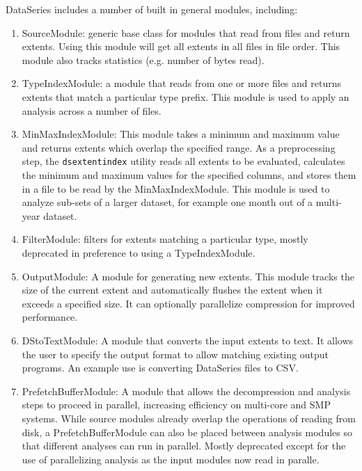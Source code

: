 DataSeries includes a number of built in general modules, including:
\begin{enumerate} 

\item SourceModule: generic base class for modules that read from 
 files and return extents.  Using this module will get all extents 
 in all files in file order.  This module also tracks statistics (e.g. number of bytes read).

  \item TypeIndexModule: a module that reads from one or more files and
returns extents that match a particular type prefix.  This module is used
to apply an analysis across a number of files.

  \item MinMaxIndexModule: This module takes a minimum and maximum
value and returns extents which overlap the specified range.  As a
preprocessing step, the {\tt dsextentindex} utility reads all extents
to be evaluated, calculates the minimum and maximum values for the
specified columns, and stores them in a file to be read by the
MinMaxIndexModule.  This module is used to analyze sub-sets of a larger
dataset, for example one month out of a multi-year dataset.

  \item FilterModule: filters for extents matching a
particular type, mostly deprecated in preference to using a
TypeIndexModule.

  \item OutputModule: A module for generating new extents.  This
module tracks the size of the current extent and automatically flushes
the extent when it exceeds a specified size.  It can optionally parallelize
compression for improved performance.

  \item DStoTextModule: A module that converts the input extents to
text.  It allows the user to specify the output format to allow
matching existing output programs.  An example use is
converting DataSeries files to CSV.

  \item PrefetchBufferModule: A module that allows the decompression
and analysis steps to proceed in parallel, increasing efficiency on
multi-core and SMP systems.  While source modules already overlap the
operations of reading from disk, a PrefetchBufferModule can also be
placed between analysis modules so that different analyses can run in
parallel.  Mostly deprecated except for the use of parallelizing
analysis as the input modules now read in paralle.


\end{enumerate}

